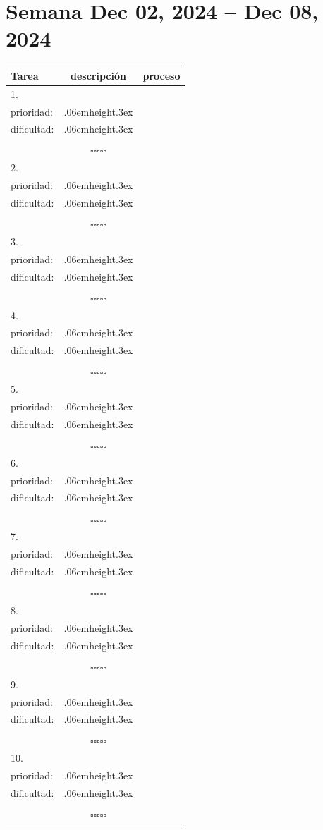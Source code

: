 \documentclass[a4paper,12pt, tikz]{scrartcl}
\newcommand\Vtextvisiblespace[1][.3em]{%
  \mbox{\kern.06em\vrule height.3ex}%
  \vbox{\hrule width#1}%
  \hbox{\vrule height.3ex}}
\newcommand{\subtablaDescrip}{ \begin{tabular}{ll}&\\ prioridad: & \Vtextvisiblespace[2em] \\ dificultad: & \Vtextvisiblespace[2em]\\&\\ \end{tabular}}
\begin{document}
\section*{Semana Dec 02, 2024 -- Dec 08, 2024}
\thispagestyle{empty}
\noindent
\begin{tabularx}{\linewidth}{|X|c c|}
    \hline
  \textbf{Tarea} & \textbf{descripción} & \textbf{proceso}\\
  \hline
   1.\vspace{4ex} &      \subtablaDescrip     & $\square\square\square\square\square$ \\
  \hline
  2.\vspace{4ex} &      \subtablaDescrip     & $\square\square\square\square\square$ \\
  \hline
  3.\vspace{4ex} &      \subtablaDescrip     & $\square\square\square\square\square$ \\
  \hline
  4.\vspace{4ex} &      \subtablaDescrip     & $\square\square\square\square\square$ \\
  \hline
  5.\vspace{4ex} &      \subtablaDescrip     & $\square\square\square\square\square$ \\
  \hline
  6.\vspace{4ex} &      \subtablaDescrip     & $\square\square\square\square\square$ \\
  \hline
  7.\vspace{4ex} &      \subtablaDescrip     & $\square\square\square\square\square$ \\
  \hline
  8.\vspace{4ex} &      \subtablaDescrip     & $\square\square\square\square\square$ \\
  \hline
  9.\vspace{4ex} &      \subtablaDescrip     & $\square\square\square\square\square$ \\
  \hline
  10.\vspace{4ex} &      \subtablaDescrip     & $\square\square\square\square\square$ \\
  \hline
\end{tabularx}

\newpage
\end{document}
